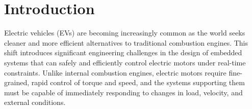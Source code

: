 \documentclass[a4paper, 11pt, titlepage]{article}
\begin{document}






\section{Introduction}
Electric vehicles (EVs) are becoming increasingly common as the world seeks cleaner and more efficient alternatives to traditional combustion engines. This shift introduces significant engineering challenges in the design of embedded systems that can safely and efficiently control electric motors under real-time constraints. Unlike internal combustion engines, electric motors require fine-grained, rapid control of torque and speed, and the systems supporting them must be capable of immediately responding to changes in load, velocity, and external conditions.\\
\end{document}
